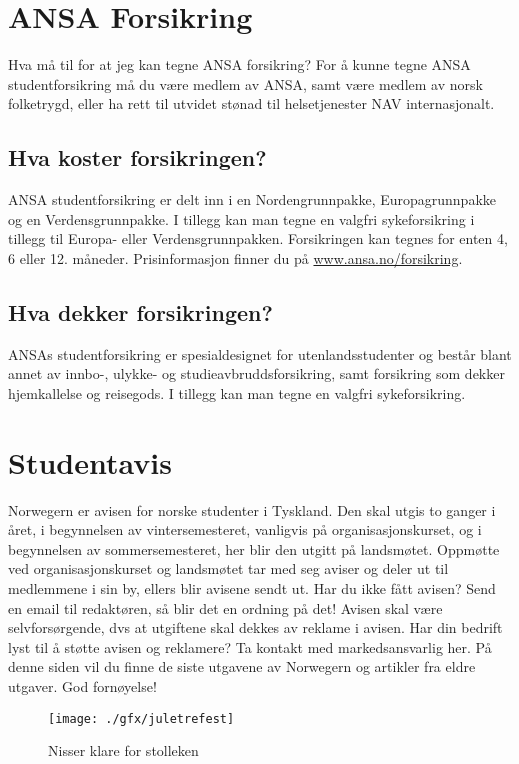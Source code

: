 \section{ANSA Forsikring}
Hva må til for at jeg kan tegne ANSA forsikring?
For å kunne tegne ANSA studentforsikring må du være medlem av ANSA, samt være medlem av norsk folketrygd, eller ha rett til utvidet stønad til helsetjenester NAV internasjonalt.

\subsection{Hva koster forsikringen?}
ANSA studentforsikring er delt inn i en Nordengrunnpakke, Europagrunnpakke og en Verdensgrunnpakke. I tillegg kan man tegne en valgfri sykeforsikring i tillegg til Europa- eller Verdensgrunnpakken. Forsikringen kan tegnes for enten 4, 6 eller 12. måneder. Prisinformasjon finner du på \url{www.ansa.no/forsikring}.

\subsection{Hva dekker forsikringen?}
ANSAs studentforsikring er spesialdesignet for utenlandsstudenter og består blant annet av innbo-, ulykke- og studieavbruddsforsikring, samt forsikring som dekker hjemkallelse og reisegods. I tillegg kan man tegne en valgfri sykeforsikring.

\section{Studentavis}
Norwegern er avisen for norske studenter i Tyskland. Den skal utgis to ganger i året, i begynnelsen av vintersemesteret, vanligvis på organisasjonskurset, og i begynnelsen av sommersemesteret, her blir den utgitt på landsmøtet.
Oppmøtte ved organisasjonskurset og landsmøtet tar med seg aviser og deler ut til medlemmene i sin by, ellers blir avisene sendt ut. Har du ikke fått avisen? Send en email til redaktøren, så blir det en ordning på det!
Avisen skal være selvforsørgende, dvs at utgiftene skal dekkes av reklame i avisen. Har din bedrift lyst til å støtte avisen og reklamere? Ta kontakt med markedsansvarlig her.
På denne siden vil du finne de siste utgavene av Norwegern og artikler fra eldre utgaver. God fornøyelse!

\begin{figure}[h]
\center
\texttt{[image: ./gfx/juletrefest]}
\caption{Nisser klare for stolleken}
\end{figure}

